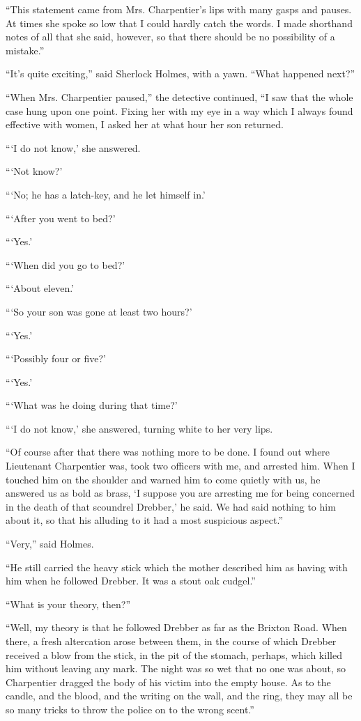 \documentclass[12pt]{book}
\begin{document}
“This statement came from Mrs. Charpentier’s lips with many gasps and pauses. At times she spoke so low that I could hardly catch the words. I made shorthand notes of all that she said, however, so that there should be no possibility of a mistake.” 

“It’s quite exciting,” said Sherlock Holmes, with a yawn. “What happened next?” 

“When Mrs. Charpentier paused,” the detective continued, “I saw that the whole case hung upon one point. Fixing her with my eye in a way which I always found effective with women, I asked her at what hour her son returned. 

“‘I do not know,’ she answered. 

“‘Not know?’ 

“‘No; he has a latch-key, and he let himself in.’ 

“‘After you went to bed?’ 

“‘Yes.’ 

“‘When did you go to bed?’ 

“‘About eleven.’ 

“‘So your son was gone at least two hours?’ 

“‘Yes.’ 

“‘Possibly four or five?’ 

“‘Yes.’ 

“‘What was he doing during that time?’ 

“‘I do not know,’ she answered, turning white to her very lips. 

“Of course after that there was nothing more to be done. I found out where Lieutenant Charpentier was, took two officers with me, and arrested him. When I touched him on the shoulder and warned him to come quietly with us, he answered us as bold as brass, ‘I suppose you are arresting me for being concerned in the death of that scoundrel Drebber,’ he said. We had said nothing to him about it, so that his alluding to it had a most suspicious aspect.” 

“Very,” said Holmes. 

“He still carried the heavy stick which the mother described him as having with him when he followed Drebber. It was a stout oak cudgel.” 

“What is your theory, then?” 

“Well, my theory is that he followed Drebber as far as the Brixton Road. When there, a fresh altercation arose between them, in the course of which Drebber received a blow from the stick, in the pit of the stomach, perhaps, which killed him without leaving any mark. The night was so wet that no one was about, so Charpentier dragged the body of his victim into the empty house. As to the candle, and the blood, and the writing on the wall, and the ring, they may all be so many tricks to throw the police on to the wrong scent.” 
\end{document}
